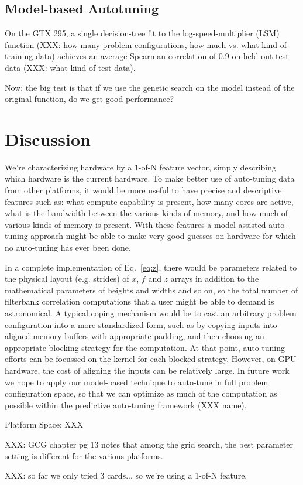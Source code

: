 \documentclass{sig-alternate}
\begin{document}
\subsection{Model-based Autotuning}

On the GTX 295, a single decision-tree fit to the log-speed-multiplier
(LSM) function (XXX: how many problem configurations, how much vs. what
kind of training data) achieves an average Spearman correlation of 0.9 on
held-out test data (XXX: what kind of test data).

Now: the big test is that if we use the genetic search on the model instead of
the original function, do we get good performance?

\section{Discussion}

We're characterizing hardware by a 1-of-N feature vector, simply describing
which hardware is the current hardware.
To make better use of auto-tuning data from other platforms, it would be more
useful to have precise and descriptive features such as: what compute
capability is present, how many cores are active, what is the bandwidth
between the various kinds of memory, and how much of various kinds of memory
is present.  With these features a model-assisted auto-tuning approach
might be able to make very good guesses on hardware for which no auto-tuning
has ever been done.

In a complete implementation of Eq.~\ref{eq:z}, there would be parameters
related to the physical layout (e.g. strides) of $x$, $f$ and $z$ arrays in
addition to the mathematical parameters of heights and widths and so on,
so the total number of filterbank correlation computations that a user might
be able to demand is astronomical.
A typical coping mechanism would be to cast an arbitrary problem configuration into a more
standardized form, such as by copying inputs into aligned memory buffers with
appropriate padding, and then choosing an appropriate blocking strategy for
the computation. At that point, auto-tuning efforts can be focussed on the
kernel for each blocked strategy. However, on GPU hardware, the cost of
aligning the inputs can be relatively large.  In future work we hope to apply
our model-based technique to auto-tune in full problem configuration space, so
that we can optimize as much of the computation as possible within the
predictive auto-tuning framework (XXX name).

Platform Space: XXX

XXX: GCG chapter pg 13 notes that among the grid search, the best parameter
setting is different for the various platforms.

XXX: so far we only tried 3 cards... so we're using a 1-of-N feature.



\end{document}
